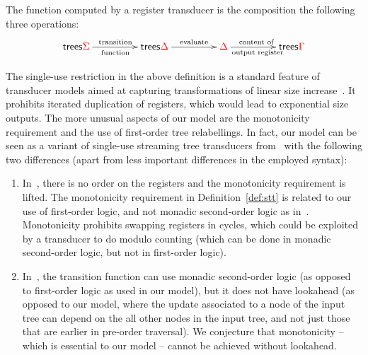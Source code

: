 The function computed by a register transducer is the composition the following three operations:
\begin{align*}
\xymatrix@C=1.6cm{
    \trees{\rSigma} {\ar[r]^{\text{transition}}_{\text{function}}} & \trees {\rDelta} \ar[r]^-{
    \text{evaluate}
    } & \rDelta {\ar[r]^{\text{content of }}_{\text{output register}}} & \trees \rGamma
}
\end{align*}

The  single-use restriction in the above definition is a standard feature of transducer models aimed at capturing transformations of linear size increase~\cite{alurStreamingStringTransducers2011,alur2017streaming}. It prohibits iterated duplication of registers, which would lead to exponential size outputs. The more unusual aspects of our model are the monotonicity requirement and the use of first-order tree relabellings. In fact, our model can be seen as a variant of  single-use streaming tree transducers from~\cite{alur2017streaming} with the following two differences (apart from less important differences in the employed syntax):
\begin{enumerate}
    \item  In~\cite{alur2017streaming}, there is no order on the registers and the monotonicity requirement is lifted. The monotonicity requirement in Definition~\ref{def:stt}  is related to our use of first-order logic, and not monadic second-order logic as in~\cite{alur2017streaming}. Monotonicity    prohibits swapping registers in cycles, which could be exploited by a transducer to do modulo counting (which can be done in monadic second-order logic, but not in first-order logic).
    \item In~\cite{alur2017streaming}, the transition function can use monadic second-order logic (as opposed to first-order logic as used in our model), but it does not have lookahead (as opposed to our model, where the update associated to a node  of the input tree can depend on the all other nodes in the input tree, and not just those that are earlier in pre-order traversal).  We conjecture that monotonicity -- which is essential to our model -- cannot be achieved without   lookahead.
\end{enumerate}

